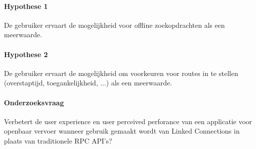  \paragraph{Hypothese 1} De gebruiker ervaart de mogelijkheid voor offline zoekopdrachten als een meerwaarde.
 
 \paragraph{Hypothese 2} De gebruiker ervaart de mogelijkheid om voorkeuren voor routes in te stellen (overstaptijd, toegankelijkheid, ...) als een meerwaarde.
 
 \paragraph{Onderzoeksvraag} Verbetert de user experience en user perceived perforance van een applicatie voor openbaar vervoer wanneer gebruik gemaakt wordt van Linked Connections in plaats van traditionele RPC API's?